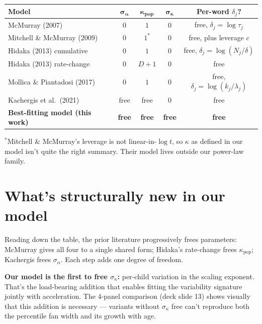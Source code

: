 \documentclass[11pt]{article}
\begin{document}
\begin{center}
\renewcommand{\arraystretch}{1.20}
\begin{tabular}{@{}lcccc@{}}
\toprule
\textbf{Model} &
$\boldsymbol{\sigma_\alpha}$ &
$\boldsymbol{\kappa_{\text{pop}}}$ &
$\boldsymbol{\sigma_\kappa}$ &
\textbf{Per-word $\delta_j$?} \\
\midrule
McMurray (2007)                & $0$        & $1$       & $0$ & free, $\delta_j = \log\tau_j$ \\
Mitchell \& McMurray (2009)    & $0$        & $1^{*}$   & $0$ & free, plus leverage $c$ \\
Hidaka (2013) cumulative       & $0$        & $1$       & $0$ & free, $\delta_j = \log(N_j/\delta)$ \\
Hidaka (2013) rate-change      & $0$        & $D{+}1$   & $0$ & free \\
Mollica \& Piantadosi (2017)   & $0$        & $1$       & $0$ & free, $\delta_j = \log(k_j/\lambda_j)$ \\
Kachergis et al.\ (2021)       & free       & free      & $0$ & free \\
\midrule
\textbf{Best-fitting model (this work)} &
\textbf{free} & \textbf{free} & \textbf{free} & \textbf{free} \\
\bottomrule
\end{tabular}
\end{center}

\noindent\footnotesize{$^{*}$Mitchell \& McMurray's leverage is not
linear-in-$\log t$, so $\kappa$ as defined in our model isn't quite
the right summary. Their model lives outside our power-law family.}

\section{What's structurally new in our model}

Reading down the table, the prior literature progressively frees
parameters: McMurray gives all four to a single shared form;
Hidaka's rate-change frees $\kappa_{\text{pop}}$; Kachergis frees
$\sigma_\alpha$. Each step adds one degree of freedom.

\textbf{Our model is the first to free $\sigma_\kappa$:} per-child
variation in the scaling exponent. That's the load-bearing addition
that enables fitting the variability signature jointly with
acceleration. The 4-panel comparison (deck slide 13) shows visually
that this addition is necessary --- variants without
$\sigma_\kappa$ free can't reproduce both the percentile fan width
and its growth with age.
\end{document}
